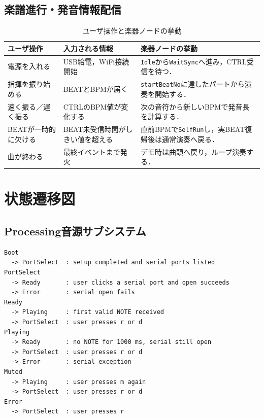 \documentclass[lualatex,book,paper=a4paper,jafontsize=11.5pt,jafontscale=1.05]{jlreq}
\newcommand{\code}[1]{\texttt{#1}}
\begin{document}
\subsection{楽譜進行・発音情報配信}
\begin{table}[H]
\centering
\caption{ユーザ操作と楽器ノードの挙動}
\label{tab:user-flow}
\begin{tabular}{p{}p{}p{}}
\toprule
\textbf{ユーザ操作} & \textbf{入力される情報} & \textbf{楽器ノードの挙動} \\
\midrule
電源を入れる & USB給電，WiFi接続開始 & \code{Idle}から\code{WaitSync}へ進み，CTRL受信を待つ．\\
指揮を振り始める & BEATとBPMが届く & \code{startBeatNo}に達したパートから演奏を開始する．\\
速く振る／遅く振る & CTRLのBPM値が変化する & 次の音符から新しいBPMで発音長を計算する．\\
BEATが一時的に欠ける & BEAT未受信時間がしきい値を超える & 直前BPMで\code{SelfRun}し，実BEAT復帰後は通常演奏へ戻る．\\
曲が終わる & 最終イベントまで発火 & デモ時は曲頭へ戻り，ループ演奏する．\\
\bottomrule
\end{tabular}
\end{table}



\section{状態遷移図}
\subsection{Processing音源サブシステム}
\begin{lstlisting}[style=textdiagram, caption={Processing 音源サブシステムの状態遷移}, label={lst:state}]
Boot
  -> PortSelect  : setup completed and serial ports listed
PortSelect
  -> Ready       : user clicks a serial port and open succeeds
  -> Error       : serial open fails
Ready
  -> Playing     : first valid NOTE received
  -> PortSelect  : user presses r or d
Playing
  -> Ready       : no NOTE for 1000 ms, serial still open
  -> PortSelect  : user presses r or d
  -> Error       : serial exception
Muted
  -> Playing     : user presses m again
  -> PortSelect  : user presses r or d
Error
  -> PortSelect  : user presses r
\end{lstlisting}
\end{document}
